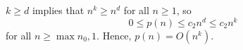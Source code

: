 $k\ge d$ implies that $n^k\ge n^d$ for all $n\ge1$, so
\[
    0 \le p(n) \le c_2n^d \le c_2n^k
\]
for all $n\ge\max{n_0,1}$.
Hence, $p(n)=O(n^k)$.
